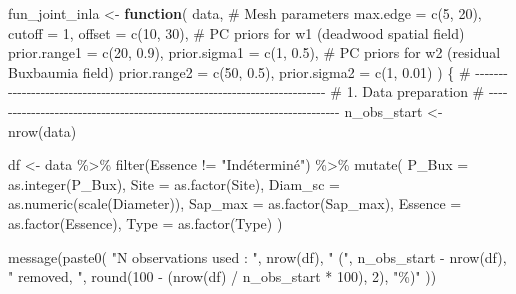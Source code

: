 \documentclass[
  letterpaper,
  DIV=11,
  numbers=noendperiod]{scrartcl}
\newenvironment{Shaded}{\begin{snugshade}}{\end{snugshade}}
\newcommand{\AttributeTok}[1]{\textcolor[rgb]{0.40,0.45,0.13}{#1}}
\newcommand{\CommentTok}[1]{\textcolor[rgb]{0.37,0.37,0.37}{#1}}
\newcommand{\ControlFlowTok}[1]{\textcolor[rgb]{0.00,0.23,0.31}{\textbf{#1}}}
\newcommand{\DecValTok}[1]{\textcolor[rgb]{0.68,0.00,0.00}{#1}}
\newcommand{\FloatTok}[1]{\textcolor[rgb]{0.68,0.00,0.00}{#1}}
\newcommand{\FunctionTok}[1]{\textcolor[rgb]{0.28,0.35,0.67}{#1}}
\newcommand{\NormalTok}[1]{\textcolor[rgb]{0.00,0.23,0.31}{#1}}
\newcommand{\OtherTok}[1]{\textcolor[rgb]{0.00,0.23,0.31}{#1}}
\newcommand{\SpecialCharTok}[1]{\textcolor[rgb]{0.37,0.37,0.37}{#1}}
\newcommand{\StringTok}[1]{\textcolor[rgb]{0.13,0.47,0.30}{#1}}
\begin{document}
\begin{Shaded}
\begin{Highlighting}[]
\NormalTok{fun\_joint\_inla }\OtherTok{\textless{}{-}} \ControlFlowTok{function}\NormalTok{(}
\NormalTok{  data,}
  \CommentTok{\# Mesh parameters}
  \AttributeTok{max.edge =} \FunctionTok{c}\NormalTok{(}\DecValTok{5}\NormalTok{, }\DecValTok{20}\NormalTok{),}
  \AttributeTok{cutoff =} \DecValTok{1}\NormalTok{,}
  \AttributeTok{offset =} \FunctionTok{c}\NormalTok{(}\DecValTok{10}\NormalTok{, }\DecValTok{30}\NormalTok{),}
  \CommentTok{\# PC priors for w1 (deadwood spatial field)}
  \AttributeTok{prior.range1 =} \FunctionTok{c}\NormalTok{(}\DecValTok{20}\NormalTok{, }\FloatTok{0.9}\NormalTok{),}
  \AttributeTok{prior.sigma1 =} \FunctionTok{c}\NormalTok{(}\DecValTok{1}\NormalTok{, }\FloatTok{0.5}\NormalTok{),}
  \CommentTok{\# PC priors for w2 (residual Buxbaumia field)}
  \AttributeTok{prior.range2 =} \FunctionTok{c}\NormalTok{(}\DecValTok{50}\NormalTok{, }\FloatTok{0.5}\NormalTok{),}
  \AttributeTok{prior.sigma2 =} \FunctionTok{c}\NormalTok{(}\DecValTok{1}\NormalTok{, }\FloatTok{0.01}\NormalTok{)}
\NormalTok{) \{}
  \CommentTok{\# {-}{-}{-}{-}{-}{-}{-}{-}{-}{-}{-}{-}{-}{-}{-}{-}{-}{-}{-}{-}{-}{-}{-}{-}{-}{-}{-}{-}{-}{-}{-}{-}{-}{-}{-}{-}{-}{-}{-}{-}{-}{-}{-}{-}{-}{-}{-}{-}{-}{-}{-}{-}{-}{-}{-}{-}{-}{-}{-}{-}{-}{-}{-}{-}{-}{-}{-}{-}{-}{-}{-}{-}{-}{-}{-}}
  \CommentTok{\# 1. Data preparation}
  \CommentTok{\# {-}{-}{-}{-}{-}{-}{-}{-}{-}{-}{-}{-}{-}{-}{-}{-}{-}{-}{-}{-}{-}{-}{-}{-}{-}{-}{-}{-}{-}{-}{-}{-}{-}{-}{-}{-}{-}{-}{-}{-}{-}{-}{-}{-}{-}{-}{-}{-}{-}{-}{-}{-}{-}{-}{-}{-}{-}{-}{-}{-}{-}{-}{-}{-}{-}{-}{-}{-}{-}{-}{-}{-}{-}{-}{-}}
\NormalTok{  n\_obs\_start }\OtherTok{\textless{}{-}} \FunctionTok{nrow}\NormalTok{(data)}

\NormalTok{  df }\OtherTok{\textless{}{-}}\NormalTok{ data }\SpecialCharTok{\%\textgreater{}\%}
    \FunctionTok{filter}\NormalTok{(Essence }\SpecialCharTok{!=} \StringTok{"Indéterminé"}\NormalTok{) }\SpecialCharTok{\%\textgreater{}\%}
    \FunctionTok{mutate}\NormalTok{(}
      \AttributeTok{P\_Bux =} \FunctionTok{as.integer}\NormalTok{(P\_Bux),}
      \AttributeTok{Site =} \FunctionTok{as.factor}\NormalTok{(Site),}
      \AttributeTok{Diam\_sc =} \FunctionTok{as.numeric}\NormalTok{(}\FunctionTok{scale}\NormalTok{(Diameter)),}
      \AttributeTok{Sap\_max =} \FunctionTok{as.factor}\NormalTok{(Sap\_max),}
      \AttributeTok{Essence =} \FunctionTok{as.factor}\NormalTok{(Essence),}
      \AttributeTok{Type =} \FunctionTok{as.factor}\NormalTok{(Type)}
\NormalTok{    )}

  \FunctionTok{message}\NormalTok{(}\FunctionTok{paste0}\NormalTok{(}
    \StringTok{"N observations used : "}\NormalTok{, }\FunctionTok{nrow}\NormalTok{(df),}
    \StringTok{" ("}\NormalTok{, n\_obs\_start }\SpecialCharTok{{-}} \FunctionTok{nrow}\NormalTok{(df), }\StringTok{" removed, "}\NormalTok{,}
    \FunctionTok{round}\NormalTok{(}\DecValTok{100} \SpecialCharTok{{-}}\NormalTok{ (}\FunctionTok{nrow}\NormalTok{(df) }\SpecialCharTok{/}\NormalTok{ n\_obs\_start }\SpecialCharTok{*} \DecValTok{100}\NormalTok{), }\DecValTok{2}\NormalTok{), }\StringTok{"\%)"}
\NormalTok{  ))}


\end{Highlighting}
\end{Shaded}
\end{document}
